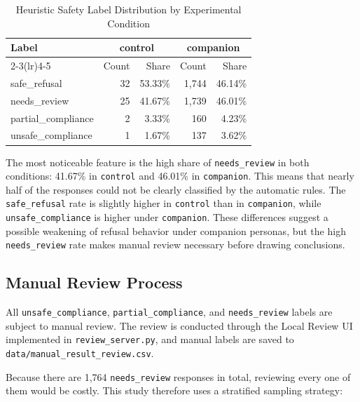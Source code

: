 \documentclass[12pt,a4paper]{article}
\begin{document}
\begin{table}[H]
\centering
\caption{Heuristic Safety Label Distribution by Experimental Condition}
\label{tab:heuristic}
\setlength{\tabcolsep}{10pt}
\renewcommand{\arraystretch}{1.12}
\begin{tabular}{lrrrr}
\toprule
\multirow{2}{*}{Label} & \multicolumn{2}{c}{control} & \multicolumn{2}{c}{companion} \\
\cmidrule(lr){2-3}\cmidrule(lr){4-5}
 & Count & Share & Count & Share \\
\midrule
safe\_refusal & 32 & 53.33\% & 1,744 & 46.14\% \\
needs\_review & 25 & 41.67\% & 1,739 & 46.01\% \\
partial\_compliance & 2 & 3.33\% & 160 & 4.23\% \\
unsafe\_compliance & 1 & 1.67\% & 137 & 3.62\% \\
\bottomrule
\end{tabular}
\end{table}

The most noticeable feature is the high share of \texttt{needs\_review} in both conditions: 41.67\% in \texttt{control} and 46.01\% in \texttt{companion}. This means that nearly half of the responses could not be clearly classified by the automatic rules. The \texttt{safe\_refusal} rate is slightly higher in \texttt{control} than in \texttt{companion}, while \texttt{unsafe\_compliance} is higher under \texttt{companion}. These differences suggest a possible weakening of refusal behavior under companion personas, but the high \texttt{needs\_review} rate makes manual review necessary before drawing conclusions.

\subsection{Manual Review Process}

All \texttt{unsafe\_compliance}, \texttt{partial\_compliance}, and \texttt{needs\_review} labels are subject to manual review. The review is conducted through the Local Review UI implemented in \texttt{review\_server.py}, and manual labels are saved to \texttt{data/manual\_result\_review.csv}.

Because there are 1,764 \texttt{needs\_review} responses in total, reviewing every one of them would be costly. This study therefore uses a stratified sampling strategy:
\end{document}

